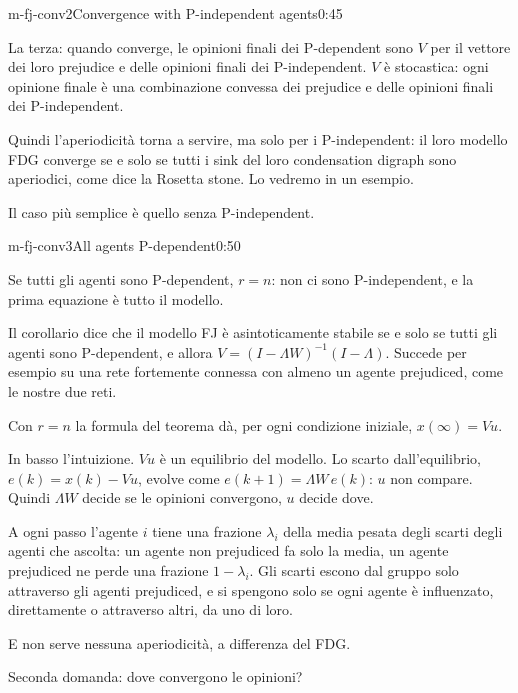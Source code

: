 \begin{slide}{m-fj-conv2}{Convergence with P-independent agents}{0:45 {\color{red}}}
\begin{discorso}
    \item {\color{blue}La terza: quando converge, le opinioni finali dei P-dependent sono $V$ per il vettore dei loro prejudice e delle opinioni finali dei P-independent. $V$ è stocastica: ogni opinione finale è una combinazione convessa dei prejudice e delle opinioni finali dei P-independent.}
    \item Quindi l'aperiodicità torna a servire, ma solo per i P-independent: {\color{red}} {\color{blue}il loro modello FDG converge se e solo se tutti i sink del loro condensation digraph sono aperiodici, come dice la Rosetta stone. Lo} vedremo in un esempio.
    \item {\color{blue}Il caso più semplice è quello senza P-independent.}
    \item {\color{red}     }
  \end{discorso}
\end{slide}

\begin{slide}{m-fj-conv3}{All agents P-dependent\nuova}{0:50}
  \begin{discorso}
    \item {\color{blue}Se tutti gli agenti sono P-dependent, $r=n$: non ci sono P-independent, e la prima equazione è tutto il modello.}
    \item {\color{blue}Il corollario dice che il modello FJ è asintoticamente stabile se e solo se tutti gli agenti sono P-dependent, e allora $V=(I-\Lambda W)^{-1}(I-\Lambda)$. Succede per esempio su una rete fortemente connessa con almeno un agente prejudiced, come le nostre due reti.}
    \item {\color{blue}Con $r=n$ la formula del teorema dà, per ogni condizione iniziale, $x(\infty)=Vu$.}
    \item {\color{blue}In basso l'intuizione. $Vu$ è un equilibrio del modello. Lo scarto dall'equilibrio, $e(k)=x(k)-Vu$, evolve come $e(k+1)=\Lambda W\,e(k)$: $u$ non compare. Quindi $\Lambda W$ decide se le opinioni convergono, $u$ decide dove.}
    \item {\color{blue}A ogni passo l'agente $i$ tiene una frazione $\lambda_i$ della media pesata degli scarti degli agenti che ascolta: un agente non prejudiced fa solo la media, un agente prejudiced ne perde una frazione $1-\lambda_i$. Gli scarti escono dal gruppo solo attraverso gli agenti prejudiced, e si spengono solo se ogni agente è influenzato, direttamente o attraverso altri, da uno di loro.}
    \item {\color{blue}E non serve nessuna aperiodicità, a differenza del FDG.}
    \item {\color{blue}Seconda domanda: dove convergono le opinioni?}
  \end{discorso}
\end{slide}


